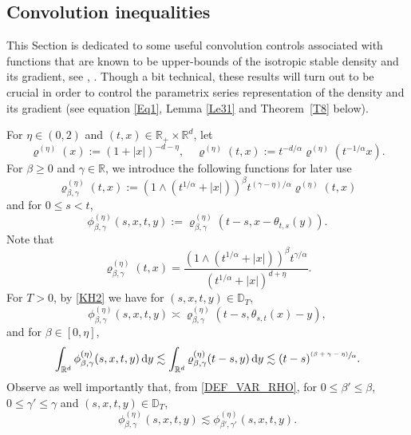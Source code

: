 \documentclass[JEP,XML,SOM,Unicode,published]{cedram}
\newcommand{\psfrac}[2]{\sfrac{(#1)}{#2}}
\theoremstyle{plain}
\theoremstyle{definition}
\newcommand\mD{\mathbb{D}}
\newcommand\mR{\mathbb{R}}
\newcommand\1{{\mathbf{1}}}
\newcommand{\dif}{\,\mathrm{d}}
\begin{document}
\subsection{Convolution inequalities}
This Section is dedicated to some useful convolution controls associated with functions that are known to be upper-bounds of the isotropic stable density and its gradient, see \eg \cite{kolo:00}, \cite{Bo-Ja}. Though a bit technical, these results will turn out to be crucial in order to control the parametrix series representation of the density and its gradient (see \eg equation \eqref{Eq1}, Lemma \ref{Le31} and Theorem~\ref{T8} below).

For $\eta\in(0,2)$ and $(t,x)\in\mR_+\times\mR^d$, let
\[
\varrho^{(\eta)}(x):=(1+|x|)^{-d-\eta},\quad \varrho^{(\eta)}(t,x):=t^{-d/\alpha}\varrho^{(\eta)}(t^{-1/\alpha}x).
\]
For $\beta\geq 0$ and $\gamma\in\mR$, we introduce the following functions for later use
\begin{equation}\label{DEF_VAR_RHO}
\varrho^{(\eta)}_{\beta,\gamma}(t,x):=(1\wedge (t^{1/\alpha}+|x|))^\beta t^{(\gamma-\eta)/\alpha}\varrho^{(\eta)}(t,x)
\end{equation}
and for $0\leq s<t$,
\begin{equation}
\label{DEF_PHI}
\phi^{(\eta)}_{\beta,\gamma}(s,x,t,y):=\varrho^{(\eta)}_{\beta,\gamma}(t-s,x-\theta_{t,s}(y)).
\end{equation}
Note that
\[
\varrho^{(\eta)}_{\beta,\gamma}(t,x)=\frac{(1\wedge (t^{1/\alpha}+|x|))^\beta t^{\gamma/\alpha}}{(t^{1/\alpha}+|x|)^{d+\eta}}.
\]
For $T>0$, by \eqref{KH2} we have for $(s,x,t,y)\in\mD_T$,
\begin{equation}\label{ES44}
\phi^{(\eta)}_{\beta,\gamma}(s,x,t,y)\asymp \varrho^{(\eta)}_{\beta,\gamma}(t-s,\theta_{s,t}(x)-y),
\end{equation}
and for $\beta\in[0,\eta]$,
\begin{equation}
\int_{\mR^d}\phi^{(\eta)}_{\beta,\gamma}(s,x,t,y)\dif y
\lesssim\int_{\mR^d}\varrho^{(\eta)}_{\beta,\gamma}(t-s,y)\dif y
\lesssim (t-s)^{\psfrac{\beta+\gamma-\eta}{\alpha}}.\label{ES4}
\end{equation}
{Observe as well importantly that, from \eqref{DEF_VAR_RHO}, for $0\le \beta'\le \beta $, $0\le \gamma'\le \gamma $
and $(s,x,t,y)\in\mD_T$,\vspace*{-3pt}
\begin{equation}
\label{DOM_STAB}
\phi^{(\eta)}_{\beta,\gamma}(s,x,t,y)\lesssim \phi^{(\eta)}_{\beta',\gamma'}(s,x,t,y).
\end{equation}
}
\end{document}
